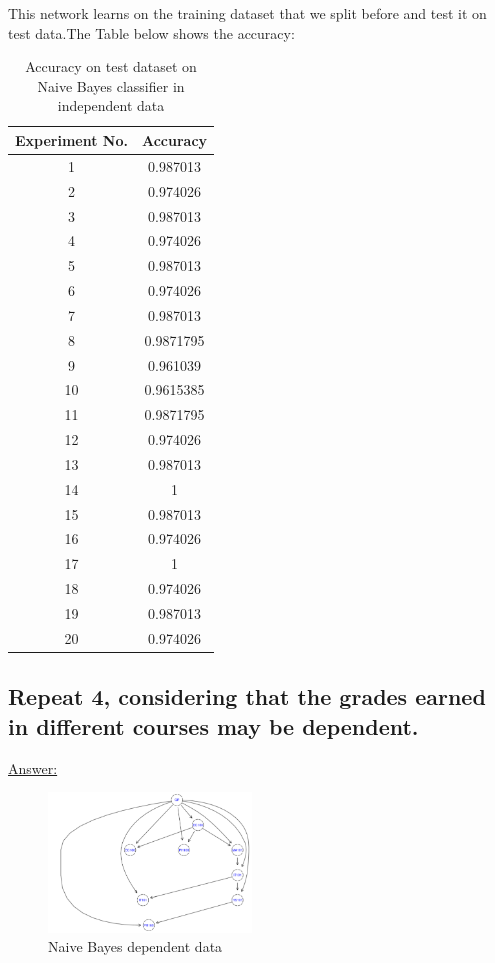 \documentclass[15pt,journal]{IEEEtran}
\begin{document}
This network learns on the training dataset that we split before and test it on test data.The Table below shows the accuracy:
\begin{table}[!ht] %
\centering
\begin{tabular}{| c | c |}
\hline
Experiment No. &  Accuracy \\
\hline 
1 & 0.987013  \\
\hline
2 & 0.974026 \\
\hline
3 & 0.987013 \\
\hline
4 & 0.974026  \\
\hline
5 & 0.987013  \\
\hline
6 & 0.974026 \\
\hline
7 & 0.987013 \\
\hline
8 & 0.9871795 \\
\hline
9 & 0.961039 \\
\hline
10 & 0.9615385 \\
\hline
11 & 0.9871795 \\
\hline
12 & 0.974026 \\
\hline
13 & 0.987013 \\
\hline
14 & 1 \\
\hline
15 & 0.987013 \\
\hline
16 & 0.974026 \\
\hline
17 & 1 \\
\hline
18 & 0.974026 \\
\hline
19 & 0.987013 \\
\hline
20 & 0.974026 \\
\hline
\end{tabular}

\label{table:Exps}
\caption{Accuracy on test dataset on Naive Bayes classifier in independent data}
\end{table}

\subsection{Repeat 4, considering that the grades earned in different courses may be dependent.}

\underline{Answer:}
\begin{figure}[H]%
\begin {center}
\includegraphics[width=0.48\textwidth]{images/Q5.png}
\caption{Naive Bayes dependent data} %
\label{fig:ecg}
\end {center}
\end{figure}
\end{document}
